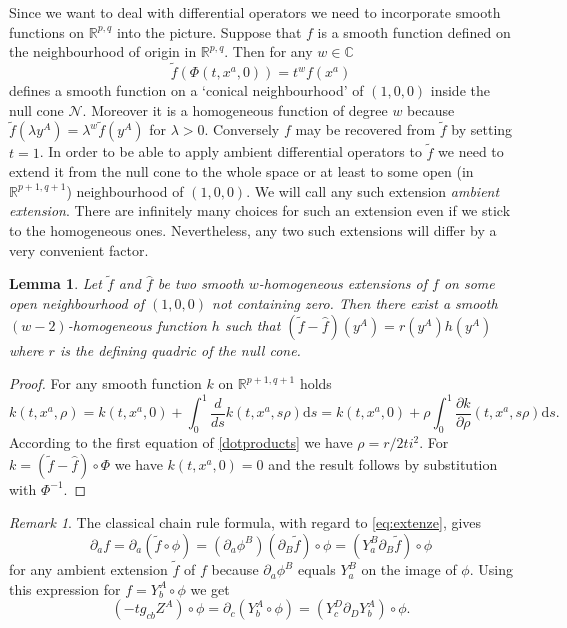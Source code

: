 \documentclass[final]{birkmult}
\newtheorem{lemma}[theorem]{Lemma}
\theoremstyle{definition}
\theoremstyle{remark}
\newtheorem{remark}[theorem]{Remark}
\numberwithin{equation}{section}
\newcommand{\p}[1]{\partial_{#1}}
\newcommand{\R}{\mathbb{R}^{p,q}}
\newcommand{\aR}{\mathbb{R}^{p+1,q+1}}
\begin{document}
Since we want to deal with differential operators we need to incorporate smooth functions on $\R$ into the picture. Suppose that $f$ is a smooth function defined on the neighbourhood of  origin in $\R$. Then for any $w \in \mathbb{C}$
\begin{equation}
	\tilde{f}(\Phi(t,x^a,0)) = t^w f(x^a)  
	\label{eq:extenze}
\end{equation}
defines a smooth function on a `conical neighbourhood' of $(1,0,0)$ inside the null cone $\mathcal{N}$. Moreover it is a homogeneous function of degree $w$ because $\tilde{f}(\lambda y^A) = \lambda^w \tilde{f}(y^A)$ for $\lambda > 0$. Conversely $f$ may be recovered from $\tilde{f}$ by setting $t = 1$. In order to be able to apply ambient differential operators to $\tilde{f}$ we need to extend it from the null cone to the whole space or at least to some open (in $\aR$) neighbourhood of $(1,0,0)$. We will call any such extension \emph{ambient extension}. There are infinitely many choices for such an extension even if we stick to the homogeneous ones. Nevertheless, any two such extensions will differ by a very convenient factor.

\begin{lemma}
	Let $\tilde{f}$ and $\hat{f}$ be two smooth $w$-homogeneous extensions of $f$ on some open neighbourhood of $(1,0,0)$ not containing zero. Then there exist a smooth $(w-2)$-homogeneous function $h$ such that $(\tilde{f}-\hat{f})(y^A) = r(y^A)h(y^A)$ where $r$ is the defining quadric of the null cone.
\end{lemma}
\begin{proof}
  For any smooth function $k$ on $\aR$ holds 
	\begin{equation*}
		k(t,x^a,\rho) = k(t,x^a,0) + \int_0^1 \frac{d}{ds} k(t,x^a,s\rho) \mathrm{d}s
				     = k(t,x^a,0) + \rho \int_0^1 \frac{\partial k}{\partial \rho}(t,x^a,s\rho) \mathrm{d}s.	
	\end{equation*}
  According to the first equation of \eqref{dotproducts} we have $\rho =r/2ti^2$. For $k=(\tilde{f}-\hat{f})\circ\Phi$ we have $k(t,x^a,0) = 0$ and the result follows by substitution with $\Phi^{-1}$. 
\end{proof}

\begin{remark}
	The classical chain rule formula, with regard to \eqref{eq:extenze}, gives 
	\begin{equation}\label{eq:chain}
		\p{a} f = \p{a} (\tilde{f} \circ \phi) = (\p{a}\phi^B)(\p{B}\tilde{f})\circ \phi = (Y_{a}^{B}\p{B}\tilde{f})\circ \phi
	\end{equation}
	for any ambient extension $\tilde{f}$ of $f$ because $\p{a}\phi^B$ equals $Y_{a}^{B}$ on the image of $\phi$.
  Using this expression for $f = Y_b^A\circ\phi$ we get 
\begin{equation}\label{eq:derivace_ypsilonu}
 (-tg_{cb}Z^A) \circ \phi =\p{c}(Y_b^A\circ \phi) =  (Y_{c}^{D} \p{D}Y^A_b)\circ \phi.
\end{equation}
\end{remark}
\end{document}
